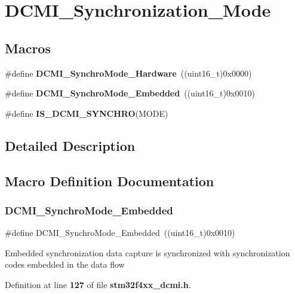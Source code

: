 \section{D\+C\+M\+I\+\_\+\+Synchronization\+\_\+\+Mode}
\label{group__DCMI__Synchronization__Mode}
\subsection*{Macros}
\begin{DoxyCompactItemize}
\item 
\#define \textbf{ D\+C\+M\+I\+\_\+\+Synchro\+Mode\+\_\+\+Hardware}~((uint16\+\_\+t)0x0000)
\item 
\#define \textbf{ D\+C\+M\+I\+\_\+\+Synchro\+Mode\+\_\+\+Embedded}~((uint16\+\_\+t)0x0010)
\item 
\#define \textbf{ I\+S\+\_\+\+D\+C\+M\+I\+\_\+\+S\+Y\+N\+C\+H\+RO}(M\+O\+DE)
\end{DoxyCompactItemize}


\subsection{Detailed Description}


\subsection{Macro Definition Documentation}
\mbox{\label{group__DCMI__Synchronization__Mode_ga66d71596091ae2a6273100ffa50334d0}} 
\subsubsection{D\+C\+M\+I\+\_\+\+Synchro\+Mode\+\_\+\+Embedded}
{\footnotesize\ttfamily \#define D\+C\+M\+I\+\_\+\+Synchro\+Mode\+\_\+\+Embedded~((uint16\+\_\+t)0x0010)}

Embedded synchronization data capture is synchronized with synchronization codes embedded in the data flow 

Definition at line \textbf{ 127} of file \textbf{ stm32f4xx\+\_\+dcmi.\+h}.


